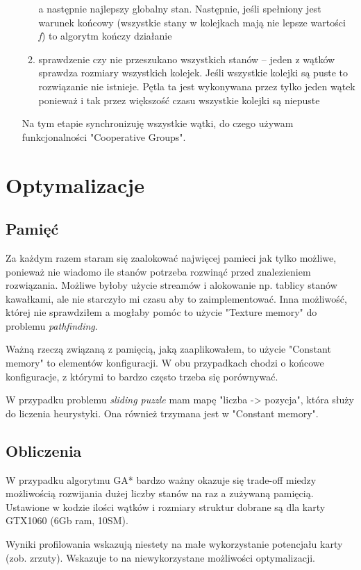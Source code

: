 \documentclass{article}
\begin{document}
\begin{enumerate}
\begin{enumerate}
            a następnie najlepszy globalny stan. Następnie, jeśli spełniony jest
           warunek końcowy (wszystkie stany w kolejkach mają nie lepsze wartości \emph{f}) to algorytm kończy działanie
    \item sprawdzenie czy nie przeszukano wszystkich stanów -- jeden z wątków sprawdza rozmiary wszystkich kolejek. Jeśli wszystkie
           kolejki są puste to rozwiązanie nie istnieje. Pętla ta jest wykonywana przez tylko jeden wątek ponieważ i tak przez większość czasu
           wszystkie kolejki są niepuste
  \end{enumerate}
Na tym etapie synchronizuję wszystkie wątki, do czego używam funkcjonalności "Cooperative Groups".
\end{enumerate}

\section{Optymalizacje}
\subsection{Pamięć}
Za każdym razem staram się zaalokować najwięcej pamieci jak tylko możliwe, ponieważ nie wiadomo ile stanów potrzeba rozwinąć przed znalezieniem
rozwiązania. Możliwe byłoby użycie streamów i alokowanie np. tablicy stanów kawałkami, ale nie starczyło mi czasu aby to zaimplementować. 
Inna możliwość, której nie sprawdziłem a mogłaby pomóc to użycie "Texture memory" do problemu \emph{pathfinding}.

Ważną rzeczą związaną z pamięcią, jaką zaaplikowałem, to użycie "Constant memory" to elementów konfiguracji. W obu przypadkach
chodzi o końcowe konfiguracje, z którymi to bardzo często trzeba się porównywać.

W przypadku problemu \emph{sliding puzzle} mam mapę "liczba -> pozycja", która służy do liczenia heurystyki. 
Ona również trzymana jest w "Constant memory".

\subsection{Obliczenia}
W przypadku algorytmu GA* bardzo ważny okazuje się trade-off miedzy możliwością rozwijania dużej liczby stanów na raz a zużywaną pamięcią.
Ustawione w kodzie ilości wątków i rozmiary struktur dobrane są dla karty GTX1060 (6Gb ram, 10SM).

Wyniki profilowania wskazują niestety na małe wykorzystanie potencjału karty (zob. zrzuty). 
Wskazuje to na niewykorzystane możliwości optymalizacji.
\end{document}
